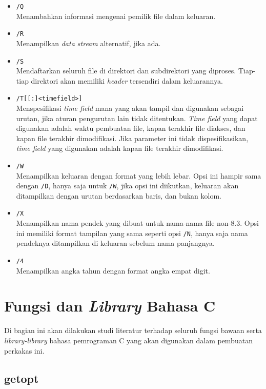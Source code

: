 \begin{itemize}
\begin{itemize}
		\item \verb|/Q|\\
		Menambahkan informasi mengenai pemilik file dalam keluaran.
		\item \verb|/R|\\
		Menampilkan \textit{data stream} alternatif, jika ada.
		\item \verb|/S|\\
		Mendaftarkan seluruh file di direktori dan subdirektori yang diproses. Tiap-tiap direktori akan memiliki \textit{header} tersendiri dalam keluarannya.
		\item \verb|/T[[:]<timefield>]|\\
		Menspesifikasi \textit{time field} mana yang akan tampil dan digunakan sebagai urutan, jika aturan pengurutan lain tidak ditentukan. \textit{Time field} yang dapat digunakan adalah waktu pembuatan file, kapan terakhir file diakses, dan kapan file terakhir dimodifikasi. Jika parameter ini tidak dispesifikasikan, \textit{time field} yang digunakan adalah kapan file terakhir dimodifikasi.
		\item \verb|/W|\\
		Menampilkan keluaran dengan format yang lebih lebar. Opsi ini hampir sama dengan \verb|/D|, hanya saja untuk \verb|/W|, jika opsi ini diikutkan, keluaran akan ditampilkan dengan urutan berdasarkan baris, dan bukan kolom.
		\item \verb|/X|\\
		Menampilkan nama pendek yang dibuat untuk nama-nama file non-8.3. Opsi ini memiliki format tampilan yang sama seperti opsi \verb|/N|, hanya saja nama pendeknya ditampilkan di keluaran sebelum nama panjangnya.
		\item \verb|/4|\\
		Menampilkan angka tahun dengan format angka empat digit.
	\end{itemize}
\end{itemize}

\section{Fungsi dan \textit{Library} Bahasa C}
\label{sec:cmodules}

Di bagian ini akan dilakukan studi literatur terhadap seluruh fungsi bawaan serta \textit{library-library} bahasa pemrograman C yang akan digunakan dalam pembuatan perkakas ini.

\subsection[getopt]{getopt \cite{loosemore:2022:gnuclibrary}}
\label{sec:cmodules-getopt}

